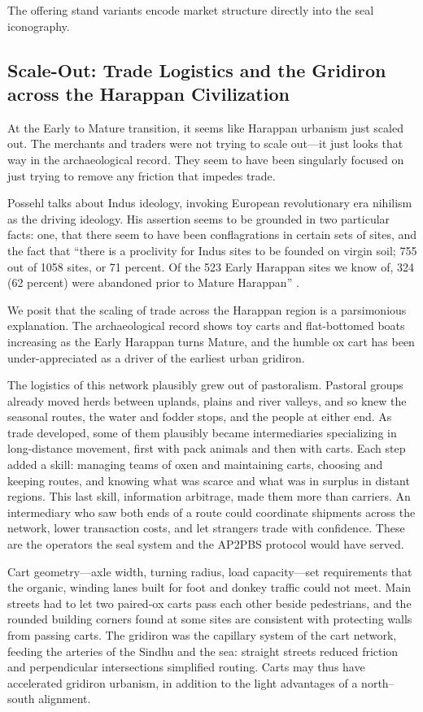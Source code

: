 \documentclass[12pt]{article}
\begin{document}
The offering stand variants encode market structure directly into the seal iconography.

\subsection{Scale-Out: Trade Logistics and the Gridiron across the Harappan Civilization}

At the Early to Mature transition, it seems like Harappan urbanism just scaled out.
The merchants and traders were not trying to scale out---it just looks that way in
the archaeological record. They seem to have been singularly focused on just trying
to remove any friction that impedes trade.

Possehl talks about Indus ideology, invoking European revolutionary era nihilism as
the driving ideology. His assertion seems to be grounded in two particular facts: one,
that there seem to have been conflagrations in certain sets of sites, and the fact that
``there is a proclivity for Indus sites to be founded on virgin soil; 755 out of 1058
sites, or 71 percent. Of the 523 Early Harappan sites we know of, 324 (62 percent)
were abandoned prior to Mature Harappan'' \citep{possehl2002indus}.

We posit that the scaling of trade across the Harappan region is a parsimonious
explanation. The archaeological record shows toy carts and flat-bottomed boats
increasing as the Early Harappan turns Mature, and the humble ox cart has been
under-appreciated as a driver of the earliest urban gridiron.

The logistics of this network plausibly grew out of pastoralism. Pastoral groups
already moved herds between uplands, plains and river valleys, and so knew the
seasonal routes, the water and fodder stops, and the people at either end. As
trade developed, some of them plausibly became intermediaries specializing in
long-distance movement, first with pack animals and then with carts. Each step
added a skill: managing teams of oxen and maintaining carts, choosing and keeping
routes, and knowing what was scarce and what was in surplus in distant regions.
This last skill, information arbitrage, made them more than carriers. An
intermediary who saw both ends of a route could coordinate shipments across the
network, lower transaction costs, and let strangers trade with confidence. These
are the operators the seal system and the AP2PBS protocol would have served.

Cart geometry---axle width, turning radius, load capacity---set requirements that
the organic, winding lanes built for foot and donkey traffic could not meet. Main
streets had to let two paired-ox carts pass each other beside pedestrians, and the
rounded building corners found at some sites are consistent with protecting walls
from passing carts. The gridiron was the capillary system of the cart network,
feeding the arteries of the Sindhu and the sea: straight streets reduced friction
and perpendicular intersections simplified routing. Carts may thus have accelerated
gridiron urbanism, in addition to the light advantages of a north--south alignment.
\end{document}
